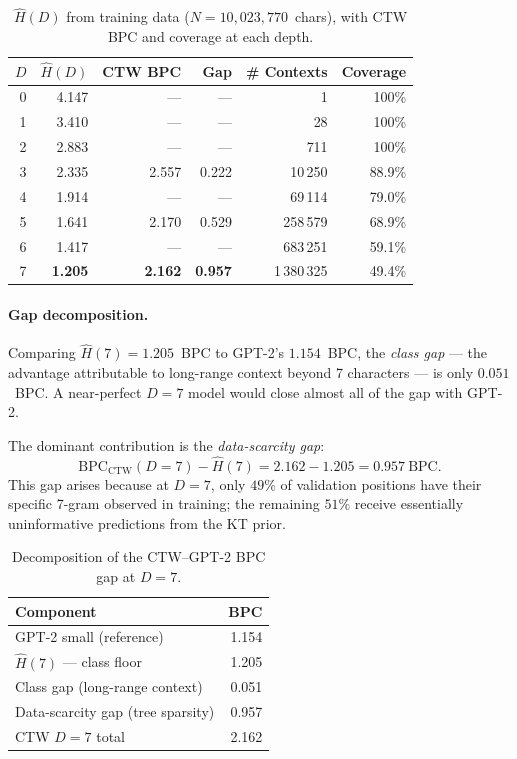 \documentclass[11pt,a4paper]{article}
\newcommand{\bpcmin}{\widehat{H}}
\begin{document}
\begin{table}[H]
\centering
\caption{$\bpcmin(D)$ from training data ($N=10{,}023{,}770$~chars),
with CTW BPC and coverage at each depth.}
\label{tab:bpcmin}
{\small\setlength{\tabcolsep}{5pt}
\begin{tabular}{rrrrrr}
\toprule
\textbf{$D$} & \textbf{$\bpcmin(D)$} & \textbf{CTW BPC} & \textbf{Gap} &
\textbf{\# Contexts} & \textbf{Coverage}\\
\midrule
0 & 4.147 & —     & —     & 1           & 100\% \\
1 & 3.410 & —     & —     & 28          & 100\% \\
2 & 2.883 & —     & —     & 711         & 100\% \\
3 & 2.335 & 2.557 & 0.222 & 10\,250     & 88.9\% \\
4 & 1.914 & —     & —     & 69\,114     & 79.0\% \\
5 & 1.641 & 2.170 & 0.529 & 258\,579    & 68.9\% \\
6 & 1.417 & —     & —     & 683\,251    & 59.1\% \\
7 & \textbf{1.205} & \textbf{2.162} & \textbf{0.957} & 1\,380\,325 & 49.4\% \\
\bottomrule
\end{tabular}}
\end{table}

\paragraph{Gap decomposition.}
Comparing $\bpcmin(7) = 1.205$~BPC to GPT-2's $1.154$~BPC,
the \emph{class gap} — the advantage attributable to long-range context
beyond 7 characters — is only $0.051$~BPC.
A near-perfect $D=7$ model would close almost all of the gap with GPT-2.

The dominant contribution is the \emph{data-scarcity gap}:
\[
  \mathrm{BPC}_{\mathrm{CTW}}(D{=}7) - \bpcmin(7) = 2.162 - 1.205 = 0.957\ \text{BPC}.
\]
This gap arises because at $D=7$, only $49\%$ of validation positions
have their specific 7-gram observed in training;
the remaining $51\%$ receive essentially uninformative predictions
from the KT prior.

\begin{table}[H]
\centering
\caption{Decomposition of the CTW--GPT-2 BPC gap at $D=7$.}
\label{tab:gap_decomp}
{\small
\begin{tabular}{lr}
\toprule
\textbf{Component} & \textbf{BPC} \\
\midrule
GPT-2 small (reference)            & 1.154 \\
$\bpcmin(7)$ — class floor         & 1.205 \\
\midrule
Class gap (long-range context)     & 0.051 \\
Data-scarcity gap (tree sparsity)  & 0.957 \\
\midrule
CTW $D=7$ total                    & 2.162 \\
\bottomrule
\end{tabular}}
\end{table}
\end{document}
